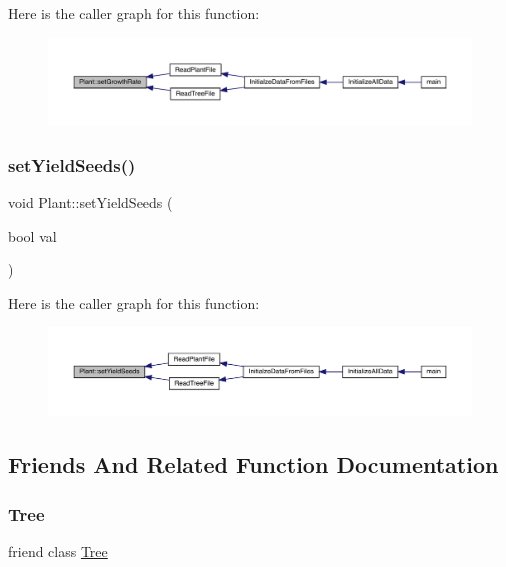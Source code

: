 Here is the caller graph for this function\+:
\nopagebreak
\begin{figure}[H]
\begin{center}
\leavevmode
\includegraphics[width=350pt]{d7/d0b/class_plant_af55fc2a9b7b3833ecc305f7fe19fd5dd_icgraph}
\end{center}
\end{figure}
\mbox{\label{class_plant_a21c26df7238a78906804603559f5cc04}} 
\subsubsection{\texorpdfstring{set\+Yield\+Seeds()}{setYieldSeeds()}}
{\footnotesize\ttfamily void Plant\+::set\+Yield\+Seeds (\begin{DoxyParamCaption}\item[{bool}]{val }\end{DoxyParamCaption})}

Here is the caller graph for this function\+:
\nopagebreak
\begin{figure}[H]
\begin{center}
\leavevmode
\includegraphics[width=350pt]{d7/d0b/class_plant_a21c26df7238a78906804603559f5cc04_icgraph}
\end{center}
\end{figure}


\subsection{Friends And Related Function Documentation}
\mbox{\label{class_plant_a4b682814d14447120dd184fd300deade}} 
\subsubsection{\texorpdfstring{Tree}{Tree}}
{\footnotesize\ttfamily friend class \mbox{\hyperlink{class_tree}{Tree}}\hspace{0.3cm}{\ttfamily [friend]}}



